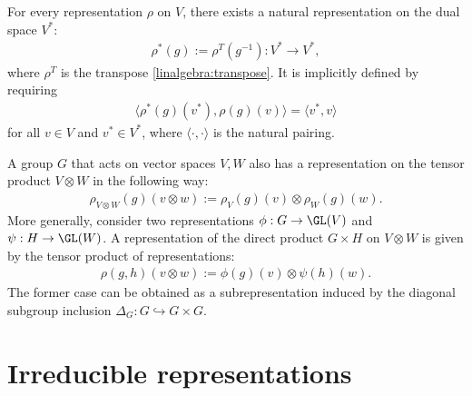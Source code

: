     \begin{example}
        For every representation $\rho$ on $V$, there exists a natural representation on the dual space $V^*$:
        \begin{gather}
            \rho^*(g) := \rho^T(g^{-1}):V^*\rightarrow V^*,
        \end{gather}
        where $\rho^T$ is the transpose \ref{linalgebra:transpose}. It is implicitly defined by requiring
        \begin{gather}
            \Big\langle\rho^*(g)(v^*),\rho(g)(v)\Big\rangle = \langle v^*,v \rangle
        \end{gather}
        for all $v\in V$ and $v^*\in V^*$, where $\langle\cdot,\cdot\rangle$ is the natural pairing.
    \end{example}

    \begin{example}
        A group $G$ that acts on vector spaces $V,W$ also has a representation on the tensor product $V\otimes W$ in the following way:
        \begin{gather}
            \rho_{V\otimes W}(g)(v\otimes w) := \rho_V(g)(v)\otimes\rho_W(g)(w).
        \end{gather}
        More generally, consider two representations $\phi:G\rightarrow\GL(V)$ and $\psi:H\rightarrow\GL(W)$. A representation of the direct product $G\times H$ on $V\otimes W$ is given by the tensor product of representations:
        \begin{gather}
            \rho(g,h)(v\otimes w) := \phi(g)(v)\otimes\psi(h)(w).
        \end{gather}
        The former case can be obtained as a subrepresentation induced by the diagonal subgroup inclusion $\Delta_G:G\hookrightarrow G\times G$.
    \end{example}


\section{Irreducible representations}\label{section:irreducibility}


